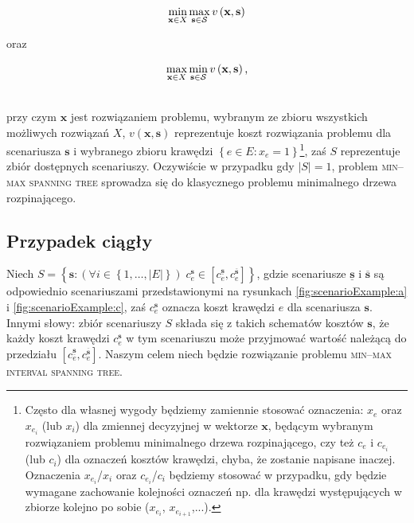 \noindent\begin{minipage}{.3\linewidth}
	\begin{equation}\label{eq:minmax}
		\min_{ \mathclap{\textbf{x} \in X}} \max_{ \mathclap{\textbf{s} \in \mathcal{S}}} v \left( \textbf{x}, \textbf{s} \right)
	\end{equation}
\end{minipage}%
\begin{minipage}{.3\linewidth}
	\centering
	oraz
\end{minipage}%
\begin{minipage}{.3\linewidth}
	\begin{equation}\label{eq:maxmin}
	\max_{ \mathclap{\textbf{x} \in X}} \min_{ \mathclap{\textbf{s} \in \mathcal{S}}} v \left( \textbf{x}, \textbf{s} \right) \text{,}
	\end{equation}
\end{minipage}
\vspace{5px}
\\
przy czym $\textbf{x}$ jest rozwiązaniem problemu, wybranym ze zbioru wszystkich możliwych rozwiązań $X$, $v \left( \textbf{x}, \textbf{s} \right)$ reprezentuje koszt rozwiązania problemu dla scenariusza $\textbf{s}$ i wybranego zbioru krawędzi $\left\{ e \in E : x_{e} = 1 \right\}$\footnote{Często dla własnej wygody będziemy zamiennie stosować oznaczenia: $x_{e}$ oraz $x_{e_{i}}$ (lub $x_{i}$) dla zmiennej decyzyjnej w wektorze $\textbf{x}$, będącym wybranym rozwiązaniem problemu minimalnego drzewa rozpinającego, czy też $c_{e}$ i $c_{e_{i}}$ (lub $c_{i}$) dla oznaczeń kosztów krawędzi, chyba, że zostanie napisane inaczej. Oznaczenia $x_{e_{i}}$/$x_{i}$ oraz $c_{e_{i}}$/$c_{i}$ będziemy stosować w przypadku, gdy będzie wymagane zachowanie kolejności oznaczeń np. dla krawędzi występujących w zbiorze kolejno po sobie ($x_{e_{i}}$, $x_{e_{i+1}}$,...).}, zaś $S$ reprezentuje zbiór dostępnych scenariuszy. Oczywiście w przypadku gdy $\left| S \right| = 1$, problem \textsc{min--max spanning tree} sprowadza się do klasycznego problemu minimalnego drzewa rozpinającego.

\subsection{Przypadek ciągły}

Niech $S = \left\{ \textbf{s} : \left( \forall i \in \left\{ 1, \dots, \left| E \right| \right\} \right) \; c^{\textbf{s}}_{e} \in \left[ c^{\underline{\textbf{s}}}_{e}, c^{\overline{\textbf{s}}}_{e} \right] \right\}$, gdzie scenariusze $\underline{\textbf{s}}$ i $\overline{\textbf{s}}$ są odpowiednio scenariuszami przedstawionymi na rysunkach \ref{fig:scenarioExample:a} i \ref{fig:scenarioExample:c}, zaś $c^{\textbf{s}}_{e}$ oznacza koszt krawędzi $e$ dla scenariusza $\textbf{s}$. Innymi słowy: zbiór scenariuszy $S$ składa się z takich schematów kosztów $\textbf{s}$, że każdy koszt krawędzi $c^{\textbf{s}}_{e}$ w tym scenariuszu może przyjmować wartość należącą do przedziału $\left[ c^{\underline{\textbf{s}}}_{e}, c^{\overline{\textbf{s}}}_{e} \right]$. Naszym celem niech będzie rozwiązanie problemu \textsc{min--max interval spanning tree}.

